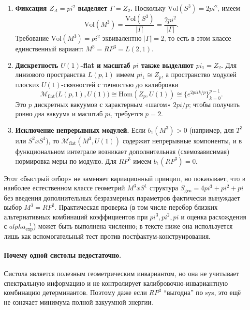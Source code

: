 \documentclass[12pt]{article}
\def\mathbb#1{#1}%
\def\alpha{alpha}%
\def\pi{pi}%
\def\times{x}%
\begin{document}
\begin{enumerate}
  \item \textbf{Фиксация $Z_A=\pi^2$ выделяет $\Gamma=\mathbb{Z}_2$.}
  Поскольку $\mathrm{Vol}(S^3)=2\pi^2$, имеем
  \begin{equation}
  \mathrm{Vol}(M^3)=\frac{\mathrm{Vol}(S^3)}{|\Gamma|}=\frac{2\pi^2}{|\Gamma|}.
  \end{equation}
  Требование $\mathrm{Vol}(M^3)=\pi^2$ эквивалентно $|\Gamma|=2$, то есть в этом классе единственный вариант: $M^3=\mathbb{RP}^3=L(2,1)$.

  \item \textbf{Дискретность $U(1)$-flat и масштаб $\pi$ также выделяют $\pi_1=\mathbb{Z}_2$.}
  Для линзового пространства $L(p,1)$ имеем $\pi_1\cong\mathbb{Z}_p$, а пространство модулей плоских $U(1)$-связностей с точностью до калибровки
  \begin{equation}
  \mathcal{M}_{\mathrm{flat}}\bigl(L(p,1),U(1)\bigr)\cong \mathrm{Hom}(\mathbb{Z}_p,U(1))\cong \{e^{2\pi i k/p}\}_{k=0}^{p-1}.
  \end{equation}
  Это $p$ дискретных вакуумов с характерным «шагом» $2\pi/p$; чтобы получить ровно два вакуума и масштаб $\pi$, требуется $p=2$.

  \item \textbf{Исключение непрерывных модулей.}
  Если $b_1(M^3)>0$ (например, для $T^3$ или $S^2\times S^1$), то $\mathcal{M}_{\mathrm{flat}}(M^3,U(1))$ содержит непрерывные компоненты, и в функциональном интеграле возникает дополнительная (схемозависимая) нормировка меры по модулю.
  Для $\mathbb{RP}^3$ имеем $b_1(\mathbb{RP}^3)=0$.
\end{enumerate}

Этот «быстрый отбор» не заменяет вариационный принцип, но показывает, что в наиболее естественном классе геометрий $M^3\times S^1$ структура $S_{\mathrm{geo}}=4\pi^3+\pi^2+\pi$ без введения дополнительных безразмерных параметров фактически вынуждает выбор $M^3=\mathbb{RP}^3$.
Практическая проверка (в том числе перебор близких альтернативных комбинаций коэффициентов при $\pi^3,\pi^2,\pi$ и оценка расхождения с $\alpha^{-1}_{\mathrm{exp}}$) может быть выполнена численно; в тексте ниже она используется лишь как вспомогательный тест против постфактум-конструирования.

\paragraph{Почему одной систолы недостаточно.}
Систола является полезным геометрическим инвариантом, но она не учитывает спектральную информацию и не контролирует калибровочно-инвариантную комбинацию детерминантов.
Поэтому даже если $\mathbb{RP}^3$ ``выгодна'' по $\mathrm{sys}$, это ещё не означает минимума полной вакуумной энергии.
\end{document}
